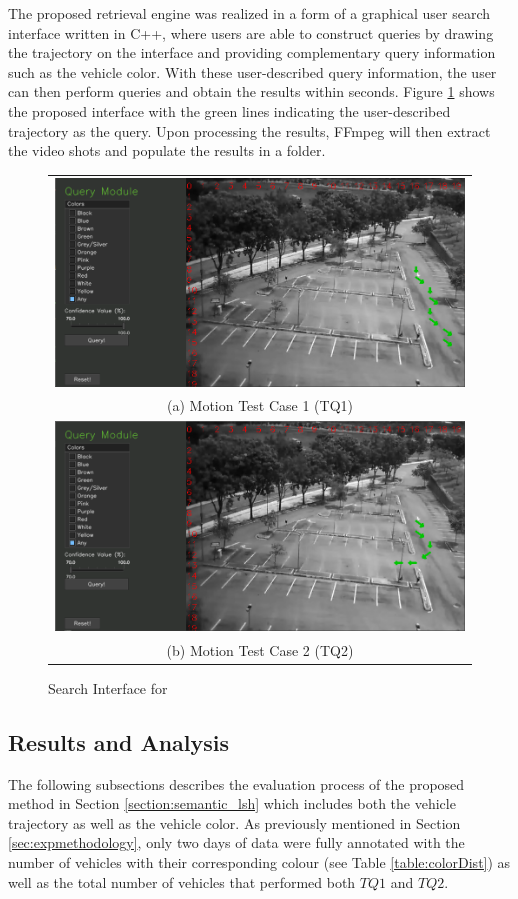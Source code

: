 The proposed retrieval engine was realized in a form of a graphical user search interface written in C++, where users are able to construct queries by drawing the trajectory on the interface and providing complementary query information such as the vehicle color. With these user-described query information, the user can then perform queries and obtain the results within seconds. Figure \ref{fig:versionOneInterface} shows the proposed interface with the green lines indicating the user-described trajectory as the query. Upon processing the results, FFmpeg will then extract the video shots and populate the results in a folder.





\begin{figure}[htb!]
	\centering
	\begin{tabular}{c}
		\includegraphics[width=0.7\linewidth]{image/retrievalOne/test1-8inputs.PNG} \\  
		(a) Motion Test Case 1 (TQ1) \\
		\includegraphics[width=0.7\linewidth]{image/retrievalOne/test2-6input.PNG}\\
		(b) Motion Test Case 2 (TQ2)
	\end{tabular}
	\caption{Search Interface for \versionOneRet} 
	\label{fig:versionOneInterface}
\end{figure}




\subsection{Results and Analysis}
The following subsections describes the evaluation process of the proposed method in Section \ref{section:semantic_lsh} which includes both the vehicle trajectory as well as the vehicle color. As previously mentioned in Section \ref{sec:expmethodology}, only two days of data were fully annotated with the number of vehicles with their corresponding colour (see Table \ref{table:colorDist}) as well as the total number of vehicles that performed both $TQ1$ and $TQ2$. 

